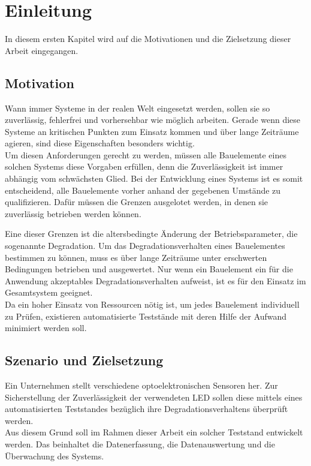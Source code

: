 
\chapter{Einleitung}
\label{chapter_einleitung}
In diesem ersten Kapitel wird auf die Motivationen und die Zielsetzung dieser Arbeit eingegangen.

\section{Motivation}
Wann immer Systeme in der realen Welt eingesetzt werden, sollen sie so zuverlässig, fehlerfrei und vorhersehbar wie möglich arbeiten. Gerade wenn diese Systeme an kritischen Punkten zum Einsatz kommen und über lange Zeiträume agieren, sind diese Eigenschaften besonders wichtig.\\
Um diesen Anforderungen gerecht zu werden, müssen alle Bauelemente eines solchen Systems diese Vorgaben erfüllen, denn die Zuverlässigkeit ist immer abhängig vom schwächsten Glied.
Bei der Entwicklung eines Systems ist es somit entscheidend, alle Bauelemente vorher anhand der gegebenen Umstände zu qualifizieren. Dafür müssen die Grenzen ausgelotet werden, in denen sie zuverlässig betrieben werden können.

Eine dieser Grenzen ist die altersbedingte Änderung der Betriebsparameter, die sogenannte Degradation.
Um das Degradationsverhalten eines Bauelementes bestimmen zu können, muss es über lange Zeiträume unter erschwerten Bedingungen betrieben und ausgewertet. Nur wenn ein Bauelement ein für die Anwendung akzeptables Degradationsverhalten aufweist, ist es für den Einsatz im Gesamtsystem geeignet.\\
Da ein hoher Einsatz von Ressourcen nötig ist, um jedes Bauelement individuell zu Prüfen, existieren automatisierte Teststände mit deren Hilfe der Aufwand minimiert werden soll.
 

\section{Szenario und Zielsetzung}
Ein Unternehmen stellt verschiedene optoelektronischen Sensoren her. Zur Sicherstellung der Zuverlässigkeit der verwendeten \ac{LED} sollen diese mittels eines automatisierten Teststandes bezüglich ihre Degradationsverhaltens überprüft werden.\\
Aus diesem Grund soll im Rahmen dieser Arbeit ein solcher Teststand entwickelt werden. Das beinhaltet die Datenerfassung, die Datenauswertung und die Überwachung des Systems.